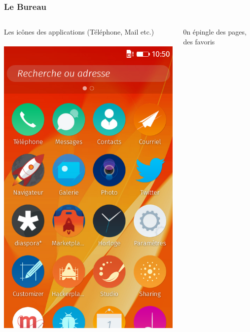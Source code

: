 \documentclass{beamer}
\begin{document}
\begin{frame}
\frametitle{Le Bureau}
\begin{center}	
\begin{columns}[t]
\begin{column}{5cm}
Les icônes des applications (Téléphone, Mail etc.)\\~\\
\includegraphics[scale=0.25] {./images/FFOS_Defaut.png} 
\end{column}
\begin{column}{5cm}
0n épingle des pages, des favoris\\~\\

\end{column}
\end{columns}
\end{center}
\end{frame}
\end{document}
